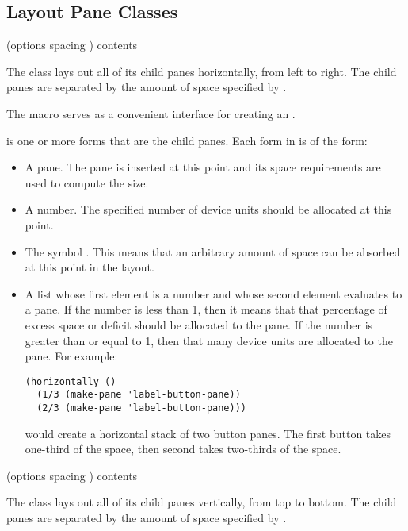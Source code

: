 \subsection {Layout Pane Classes}

 {(\rest options \key spacing \allow) \body contents}

The  class lays out all of its child panes horizontally, from left
to right.  The child panes are separated by the amount of space specified by
.

The  macro serves as a convenient interface for creating an
.

 is one or more forms that are the child panes.  Each form in
 is of the form:

\begin{itemize}
\item A pane.  The pane is inserted at this point and its space requirements are
used to compute the size.

\item A number.  The specified number of device units should be allocated at
this point.

\item The symbol .  This means that an arbitrary amount of space can
be absorbed at this point in the layout.

\item A list whose first element is a number and whose second element evaluates
to a pane.  If the number is less than 1, then it means that that percentage of
excess space or deficit should be allocated to the pane.  If the number is
greater than or equal to 1, then that many device units are allocated to the
pane.  For example:

\begin{verbatim}
(horizontally ()
  (1/3 (make-pane 'label-button-pane))
  (2/3 (make-pane 'label-button-pane)))
\end{verbatim}

would create a horizontal stack of two button panes.  The first button takes
one-third of the space, then second takes two-thirds of the space.
\end{itemize}


 {(\rest options \key spacing \allow) \body contents} 

The  class lays out all of its child panes vertically, from top to
bottom.  The child panes are separated by the amount of space specified by
.

